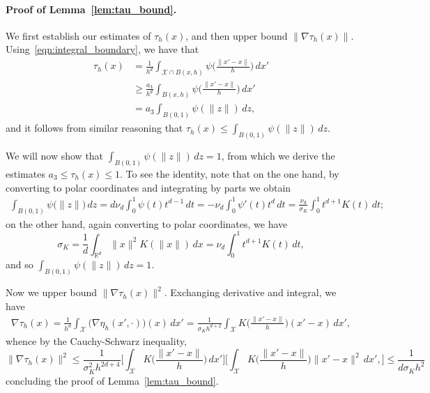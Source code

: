 \documentclass[twoside]{article}
\newcommand{\Reals}{\mathbb{R}}
\newcommand{\1}{\mathbf{1}}
\newcommand{\Xset}{\mathcal{X}}
\theoremstyle{definition}
\theoremstyle{remark}
\begin{document}
\paragraph{Proof of Lemma~\ref{lem:tau_bound}.}
We first establish our estimates of $\tau_h(x)$, and then upper bound $\|\nabla\tau_h(x)\|$. Using~\eqref{eqn:integral_boundary}, we have that
\begin{align*}
\tau_h(x) & = \frac{1}{h^d} \int_{\Xset \cap B(x,h)} \psi\biggl(\frac{\|x' - x\|}{h}\biggr) \,dx' \\
& \geq \frac{a_3}{h^d} \int_{B(x,h)} \psi\biggl(\frac{\|x' - x\|}{h}\biggr) \,dx' \\
& = a_3\int_{B(0,1)} \psi(\|z\|) \,dz,
\end{align*}
and it follows from similar reasoning that $\tau_h(x) \leq \int_{B(0,1)} \psi(\|z\|) \,dz$. 

We will now show that $\int_{B(0,1)} \psi(\|z\|) \,dz = 1$, from which we derive the estimates $a_3 \leq \tau_h(x) \leq 1$. To see the identity, note that on the one hand, by converting to polar coordinates and integrating by parts we obtain
\begin{align*}
\int_{B(0,1)} \psi\bigl(\|z\|\bigr) \,dz = d \nu_d \int_{0}^{1} \psi(t) t^{d - 1} \,dt = -\nu_d \int_{0}^{1} \psi'(t) t^{d} \,dt = \frac{\nu_d}{\sigma_K} \int_{0}^{1} t^{d + 1} K(t) \,dt;
\end{align*}
on the other hand, again converting to polar coordinates, we have
\begin{equation*}
\sigma_K = \frac{1}{d} \int_{\Reals^d} \|x\|^2 K(\|x\|) \,dx = \nu_d \int_{0}^{1}t^{d + 1} K(t) \,dt,
\end{equation*}
and so $\int_{B(0,1)} \psi(\|z\|) \,dz = 1$.

Now we upper bound $\|\nabla\tau_h(x)\|^2$. Exchanging derivative and integral, we have
\begin{align*}
\nabla\tau_h(x) = \frac{1}{h^d} \int_{\Xset} \bigl(\nabla \eta_h(x',\cdot)\bigr)(x) \,dx' = \frac{1}{\sigma_K h^{d + 2}} \int_{\Xset} K\biggl(\frac{\|x' - x\|}{h}\biggr)(x' - x)\,dx',
\end{align*}
whence by the Cauchy-Schwarz inequality,
\begin{equation*}
\|\nabla\tau_h(x)\|^2 \leq \frac{1}{\sigma_K^2 h^{2d + 4}} \biggl[\int_{\Xset} K\biggl(\frac{\|x' - x\|}{h}\biggr)\,dx'\biggr] \biggl[\int_{\Xset} K\biggl(\frac{\|x' - x\|}{h}\biggr)\|x' - x\|^2\,dx',\biggr] \leq \frac{1}{d\sigma_K h^{2}}
\end{equation*}
concluding the proof of Lemma~\ref{lem:tau_bound}. 
\end{document}
